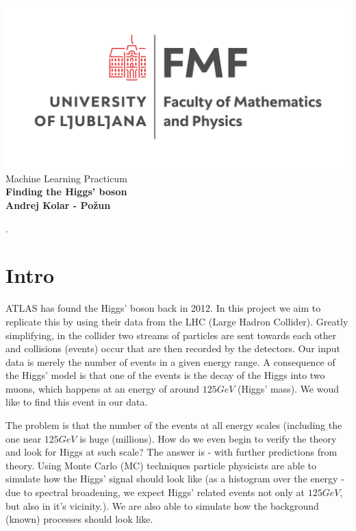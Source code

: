 \documentclass{article}
\begin{document}
\begin{titlepage}
    \begin{center}
        \vspace*{1cm}
        \Large
\includegraphics[width=.4\linewidth]{../logo.pdf}\\
        \Large
\vspace{1cm}
        Machine Learning Practicum\\
        \huge
        \textbf{Finding the Higgs' boson\\}
\Large  
        \vspace{1cm}
        \textbf{Andrej Kolar - Po{\v z}un\\}
        \vspace{0.8cm}

\vfill
\normalsize
\end{center}. 
\end{titlepage}
\newpage
{}
\section*{Intro}
ATLAS has found the Higgs' boson back in 2012. In this project we aim to replicate this by using their data from the LHC (Large Hadron Collider). 
Greatly simplifying, in the collider two streams of particles are sent towards each other and collisions (events) occur that are then recorded by the detectors. Our input data is merely the number of events in a given energy range.
A consequence of the Higgs' model is that one of the events is the decay of the Higgs into two muons, which happens at an energy of around $125 GeV$ (Higgs' mass). We woud like to find this event in our data.

The problem is that the number of the events at all energy scales (including the one near $125 GeV$ is huge (millions). How do we even begin to verify the theory and look for Higgs at such scale?
The answer is - with further predictions from theory. Using Monte Carlo (MC) techniques particle physicists are able to simulate how the Higgs' signal should look like (as a histogram over the energy - due to spectral broadening, we expect Higgs' related events not only at $125 GeV$, but also in it's vicinity.). We are also able to simulate how the background (known) processes should look like.
\end{document}
